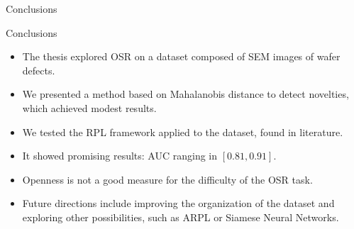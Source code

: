 \begin{frame}{Conclusions}
    \begin{normalblock}{Conclusions}
        \begin{itemize}
        \item <1-> The thesis explored OSR on a dataset composed of SEM images of wafer defects.
        \item <2-> We presented a method based on Mahalanobis distance to detect novelties, which achieved modest results.
        \item <3-> We tested the RPL framework applied to the dataset, found in literature.
        \item <4-> It showed promising results: AUC ranging in $[0.81, 0.91]$.
        \item <5-> Openness is not a good measure for the difficulty of the OSR task.
        \item <6-> Future directions include improving the organization of the dataset and exploring other possibilities, such as ARPL or Siamese Neural Networks.
        \end{itemize}
    \end{normalblock}
\end{frame}
